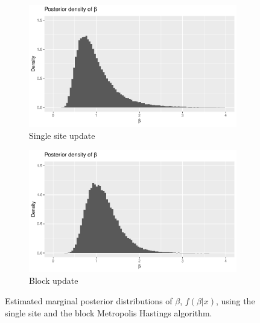 \begin{figure}[H]
    \centering
    \begin{subfigure}[b]{0.49\textwidth}
        \centering
        \includegraphics[width = \textwidth]{Images/post_beta_single.pdf}
        \caption{Single site update}
        \label{fig:post_beta_single}
    \end{subfigure}
    \begin{subfigure}[b]{0.49\textwidth}
        \centering
        \includegraphics[width = \textwidth]{Images/post_beta_block.pdf}
        \caption{Block update}
        \label{fig:post_beta_block}
    \end{subfigure}
     \caption{Estimated marginal posterior distributions of $\beta$, $f(\beta|x)$, using the single site and the block Metropolis Hastings algorithm.}
    \label{fig:post_beta}
\end{figure}


